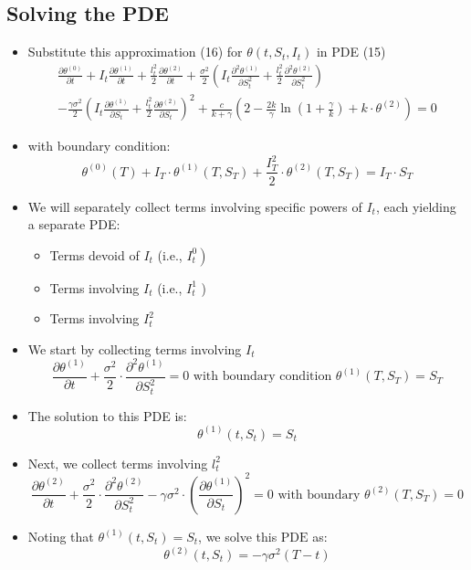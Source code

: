 \documentclass[10pt]{article}
\begin{document}
\subsection{Solving the PDE}

\begin{itemize} 
    \item Substitute this approximation (16) for $\theta\left(t, S_{t}, I_{t}\right)$ in PDE (15)
    $$
    \begin{array}{l}
    \frac{\partial \theta^{(0)}}{\partial t}+I_{t} \frac{\partial \theta^{(1)}}{\partial t}+\frac{l_{t}^{2}}{2} \frac{\partial \theta^{(2)}}{\partial t}+\frac{\sigma^{2}}{2}\left(I_{t} \frac{\partial^{2} \theta^{(1)}}{\partial S_{t}^{2}}+\frac{l_{t}^{2}}{2} \frac{\partial^{2} \theta^{(2)}}{\partial S_{t}^{2}}\right) \\
    -\frac{\gamma \sigma^{2}}{2}\left(I_{t} \frac{\partial \theta^{(1)}}{\partial S_{t}}+\frac{l_{t}^{2}}{2} \frac{\partial \theta^{(2)}}{\partial S_{t}}\right)^{2}+\frac{c}{k+\gamma}\left(2-\frac{2 k}{\gamma} \ln \left(1+\frac{\gamma}{k}\right)+k \cdot \theta^{(2)}\right)=0
    \end{array}
    $$
    \item with boundary condition:
    \[
    \theta^{(0)}(T)+I_{T} \cdot \theta^{(1)}\left(T, S_{T}\right)+\frac{I_{T}^{2}}{2} \cdot \theta^{(2)}\left(T, S_{T}\right)=I_{T} \cdot S_{T} \tag{17}
    \]
    \item We will separately collect terms involving specific powers of $I_{t}$, each yielding a separate PDE:
    \begin{itemize} 
        \item Terms devoid of $I_{t}$ (i.e., $\left.I_{t}^{0}\right)$
        \item Terms involving $I_{t}$ (i.e., $I_{t}^{1}$ )
        \item Terms involving $I_{t}^{2}$
    \end{itemize}
\end{itemize}

\begin{itemize} 
    \item We start by collecting terms involving $I_{t}$
    \[
    \frac{\partial \theta^{(1)}}{\partial t}+\frac{\sigma^{2}}{2} \cdot \frac{\partial^{2} \theta^{(1)}}{\partial S_{t}^{2}}=0 \text { with boundary condition } \theta^{(1)}\left(T, S_{T}\right)=S_{T}
    \]
    \item The solution to this PDE is:
    \[
    \theta^{(1)}\left(t, S_{t}\right)=S_{t} \tag{18}
    \]
    \item Next, we collect terms involving $l_{t}^{2}$
    \[
    \frac{\partial \theta^{(2)}}{\partial t}+\frac{\sigma^{2}}{2} \cdot \frac{\partial^{2} \theta^{(2)}}{\partial S_{t}^{2}}-\gamma \sigma^{2} \cdot\left(\frac{\partial \theta^{(1)}}{\partial S_{t}}\right)^{2}=0 \text { with boundary } \theta^{(2)}\left(T, S_{T}\right)=0
    \]
    \item Noting that $\theta^{(1)}\left(t, S_{t}\right)=S_{t}$, we solve this $\mathrm{PDE}$ as:
    \[
    \theta^{(2)}\left(t, S_{t}\right)=-\gamma \sigma^{2}(T-t) \tag{19}
    \]
\end{itemize}
\end{document}
